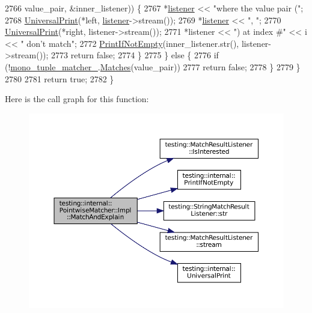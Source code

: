 \begin{DoxyCode}
2766                   value\_pair, &inner\_listener)) \{
2767             *\hyperlink{namespaceinteractive__marker_a0e579ab555212bb5e2c9f8a675b7618a}{listener} << \textcolor{stringliteral}{"where the value pair ("};
2768             \hyperlink{namespacetesting_1_1internal_a30708fa2bacf11895b03bdb21eb72309}{UniversalPrint}(*left, \hyperlink{namespaceinteractive__marker_a0e579ab555212bb5e2c9f8a675b7618a}{listener}->stream());
2769             *\hyperlink{namespaceinteractive__marker_a0e579ab555212bb5e2c9f8a675b7618a}{listener} << \textcolor{stringliteral}{", "};
2770             \hyperlink{namespacetesting_1_1internal_a30708fa2bacf11895b03bdb21eb72309}{UniversalPrint}(*right, listener->stream());
2771             *listener << \textcolor{stringliteral}{") at index #"} << i << \textcolor{stringliteral}{" don't match"};
2772             \hyperlink{namespacetesting_1_1internal_afa4cd5d7933878d6d820b32c87bb2767}{PrintIfNotEmpty}(inner\_listener.str(), listener->stream());
2773             \textcolor{keywordflow}{return} \textcolor{keyword}{false};
2774           \}
2775         \} \textcolor{keywordflow}{else} \{
2776           \textcolor{keywordflow}{if} (!\hyperlink{classtesting_1_1internal_1_1PointwiseMatcher_1_1Impl_ac94a851d56fe3f4f900da94cdc08c973}{mono\_tuple\_matcher\_}.\hyperlink{classtesting_1_1internal_1_1MatcherBase_a3b479673ff40cac1a7d548e91d789cb2}{Matches}(value\_pair))
2777             \textcolor{keywordflow}{return} \textcolor{keyword}{false};
2778         \}
2779       \}
2780 
2781       \textcolor{keywordflow}{return} \textcolor{keyword}{true};
2782     \}
\end{DoxyCode}
Here is the call graph for this function\+:
\nopagebreak
\begin{figure}[H]
\begin{center}
\leavevmode
\includegraphics[width=350pt]{classtesting_1_1internal_1_1PointwiseMatcher_1_1Impl_a4253946989f3743c4dd983909f2d062b_cgraph}
\end{center}
\end{figure}


